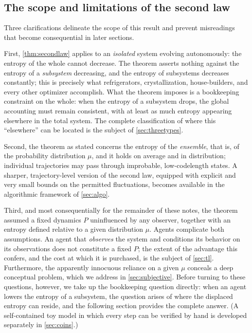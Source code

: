 \documentclass[11pt]{article}
\begin{document}
\subsection{The scope and limitations of the second law}
\label{sec:forbids}

Three clarifications delineate the scope of this result and prevent misreadings that become consequential in later sections.

First, \cref{thm:secondlaw} applies to an \emph{isolated} system evolving autonomously: the entropy of the whole cannot decrease. The theorem asserts nothing against the entropy of a \emph{subsystem} decreasing, and the entropy of subsystems decreases constantly; this is precisely what refrigerators, crystallization, house-builders, and every other optimizer accomplish. What the theorem imposes is a bookkeeping constraint on the whole: when the entropy of a subsystem drops, the global accounting must remain consistent, with at least as much entropy appearing elsewhere in the total system. The complete classification of where this ``elsewhere'' can be located is the subject of \cref{sec:threetypes}.

Second, the theorem as stated concerns the entropy of the \emph{ensemble}, that is, of the probability distribution $\mu$, and it holds on average and in distribution; individual trajectories may pass through improbable, low-codelength states. A sharper, trajectory-level version of the second law, equipped with explicit and very small bounds on the permitted fluctuations, becomes available in the algorithmic framework of \cref{sec:algo}.

Third, and most consequentially for the remainder of these notes, the theorem assumed a fixed dynamics $P$ uninfluenced by any observer, together with an entropy defined relative to a given distribution $\mu$. Agents complicate both assumptions. An agent that \emph{observes} the system and conditions its behavior on its observations does not constitute a fixed $P$; the extent of the advantage this confers, and the cost at which it is purchased, is the subject of \cref{sec:tl}. Furthermore, the apparently innocuous reliance on a given $\mu$ conceals a deep conceptual problem, which we address in \cref{sec:subjective}. Before turning to these questions, however, we take up the bookkeeping question directly: when an agent lowers the entropy of a subsystem, the question arises of where the displaced entropy can reside, and the following section provides the complete answer. (A self-contained toy model in which every step can be verified by hand is developed separately in \cref{sec:coins}.)
\end{document}
